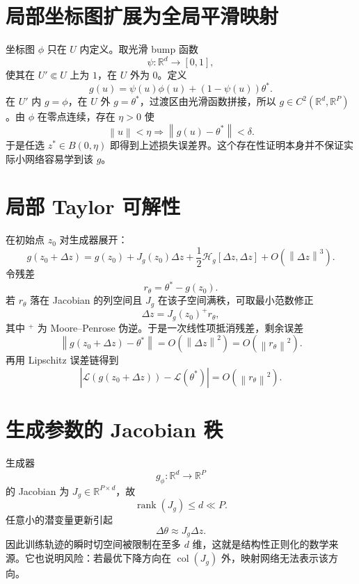 \documentclass[UTF8,12pt,a4paper,fontset=none]{ctexart}
\numberwithin{equation}{section}
\newcommand{\R}{\mathbb{R}}
\newcommand{\Loss}{\mathcal{L}}
\newcommand{\norm}[1]{\left\lVert #1\right\rVert}
\newcommand{\rank}{\operatorname{rank}}
\begin{document}
\section{局部坐标图扩展为全局平滑映射}
坐标图 $\phi$ 只在 $U$ 内定义。取光滑 bump 函数
\begin{equation}
 \psi:\R^d\to[0,1],
\end{equation}
使其在 $U'\Subset U$ 上为 $1$，在 $U$ 外为 $0$。定义
\begin{equation}
 \boxed{
 g(u)=\psi(u)\phi(u)+(1-\psi(u))\theta^*.
 }
\end{equation}
在 $U'$ 内 $g=\phi$，在 $U$ 外 $g=\theta^*$，过渡区由光滑函数拼接，所以 $g\in C^2(\R^d,\R^P)$。由 $\phi$ 在零点连续，存在 $\eta>0$ 使
\begin{equation}
 \norm{u}<\eta\Rightarrow\norm{g(u)-\theta^*}<\delta.
\end{equation}
于是任选 $z^*\in B(0,\eta)$ 即得到上述损失误差界。这个存在性证明本身并不保证实际小网络容易学到该 $g$。

\section{局部 Taylor 可解性}
在初始点 $z_0$ 对生成器展开：
\begin{equation}
 g(z_0+\Delta z)
 =g(z_0)+J_g(z_0)\Delta z
 +\frac12\mathcal H_g[\Delta z,\Delta z]+O(\norm{\Delta z}^3).
\end{equation}
令残差
\begin{equation}
 r_\theta=\theta^*-g(z_0).
\end{equation}
若 $r_\theta$ 落在 Jacobian 的列空间且 $J_g$ 在该子空间满秩，可取最小范数修正
\begin{equation}
 \Delta z=J_g(z_0)^+r_\theta,
\end{equation}
其中 $^+$ 为 Moore--Penrose 伪逆。于是一次线性项抵消残差，剩余误差
\begin{equation}
 \norm{g(z_0+\Delta z)-\theta^*}
 =O(\norm{\Delta z}^2)
 =O(\norm{r_\theta}^2).
\end{equation}
再用 Lipschitz 误差链得到
\begin{equation}
 |\Loss(g(z_0+\Delta z))-\Loss(\theta^*)|
 =O(\norm{r_\theta}^2).
\end{equation}

\section{生成参数的 Jacobian 秩}
生成器
\begin{equation}
 g_\phi:\R^d\to\R^P
\end{equation}
的 Jacobian 为 $J_g\in\R^{P\times d}$，故
\begin{equation}
 \rank(J_g)\le d\ll P.
\end{equation}
任意小的潜变量更新引起
\begin{equation}
 \Delta\theta\approx J_g\Delta z.
\end{equation}
因此训练轨迹的瞬时切空间被限制在至多 $d$ 维，这就是结构性正则化的数学来源。它也说明风险：若最优下降方向在 $\operatorname{col}(J_g)$ 外，映射网络无法表示该方向。
\end{document}
